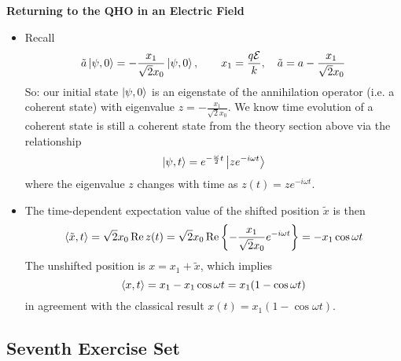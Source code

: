 \documentclass[11pt, a4paper]{article}
\begin{document}
\textbf{Returning to the QHO in an Electric Field}
\begin{itemize}
	\item Recall
	\begin{equation*}
		\tilde{a} \ket{\psi, 0} = - \frac{x_{1}}{\sqrt{2}x_{0}} \ket{\psi, 0}, \qquad x_{1} = \frac{q\mathcal{E}}{k}, \quad \tilde{a} = a - \frac{x_{1}}{\sqrt{2}x_{0}}
	\end{equation*}
	So: our initial state $ \ket{\psi, 0} $ is an eigenstate of the annihilation operator (i.e. a coherent state) with eigenvalue $ z = - \frac{x_{1}}{\sqrt{2}x_{0}} $. We know time evolution of a coherent state is still a coherent state from the theory section above via the relationship
	\begin{equation*}
		\ket{\psi, t} = e^{-\frac{\omega}{2}t}\ket{ze^{-i\omega t}}
	\end{equation*}
	where the eigenvalue $ z $ changes with time as $ 	z(t) = ze^{-i\omega t} $. 
	
	\item The time-dependent expectation value of the shifted position $ \tilde{x} $ is then
	\begin{equation*}
		\ev{\tilde{x}, t} = \sqrt{2}x_{0}\Re z(t) = \sqrt{2}x_{0}\Re \left\{- \frac{x_{1}}{\sqrt{2}x_{0}}e^{-i\omega t}\right\} = - x_{1} \cos \omega t
	\end{equation*}
	The unshifted position is $ x = x_{1} + \tilde{x} $, which implies
	\begin{equation*}
		\ev{x, t} = x_{1} - x_{1}\cos \omega t = x_{1}(1 - \cos \omega t)
	\end{equation*}
	in agreement with the classical result $ x(t) = x_{1}(1 - \cos \omega t) $. 
\end{itemize}


\subsection{Seventh Exercise Set}
\end{document}
